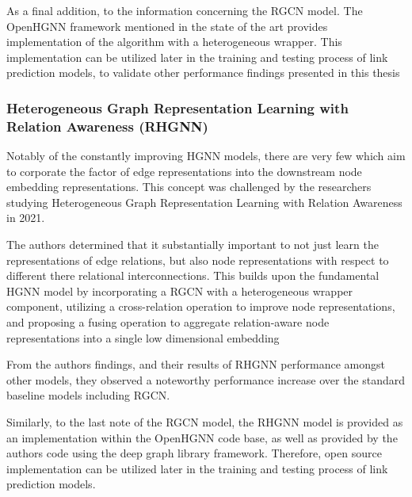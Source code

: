 As a final addition, to the information concerning the RGCN model. The OpenHGNN framework mentioned in the state of the art provides implementation of the algorithm with a heterogeneous wrapper. This implementation can be utilized later in the training and testing process of link prediction models, to validate other performance findings presented in this thesis

\subsubsection{Heterogeneous Graph Representation Learning with Relation Awareness (RHGNN)}
Notably of the constantly improving HGNN models, there are very few which aim to corporate the factor of edge representations into the downstream node embedding representations. This concept was challenged by the researchers studying Heterogeneous Graph Representation Learning with Relation Awareness \cite{rhgnn2021} in 2021. 


The authors determined that it substantially important to not just learn the representations of edge relations, but also node representations with respect to different there relational interconnections. This builds upon the fundamental HGNN model by incorporating a RGCN with a heterogeneous wrapper component, utilizing a cross-relation operation to improve node representations, and proposing a fusing operation to aggregate relation-aware node representations into a single low dimensional embedding\cite{rhgnn2021}


From the authors findings, and their results of RHGNN performance amongst other models, they observed a noteworthy performance increase over the standard baseline models including RGCN.

Similarly, to the last note of the RGCN model, the RHGNN model is provided as an implementation within the OpenHGNN code base, as well as provided by the authors code using the deep graph library framework. Therefore, open source implementation can be utilized later in the training and testing process of link prediction models.


\newpage